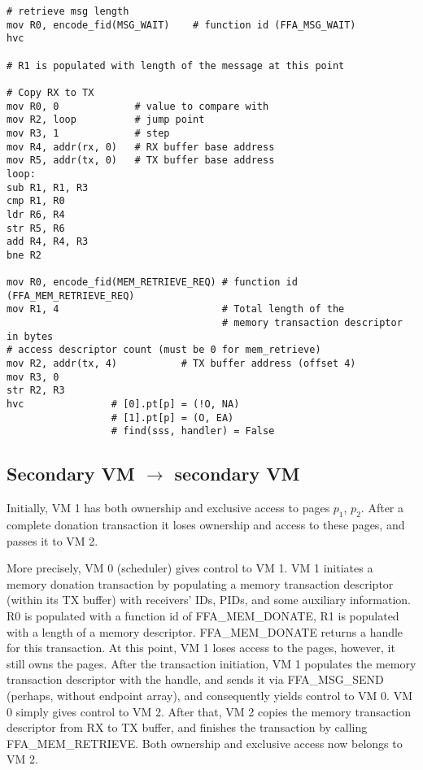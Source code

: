 \documentclass{article}
\begin{document}
\begin{lstlisting}[caption={VM 1}]
# retrieve msg length
mov R0, encode_fid(MSG_WAIT)    # function id (FFA_MSG_WAIT)
hvc

# R1 is populated with length of the message at this point

# Copy RX to TX
mov R0, 0             # value to compare with
mov R2, loop          # jump point
mov R3, 1             # step
mov R4, addr(rx, 0)   # RX buffer base address
mov R5, addr(tx, 0)   # TX buffer base address
loop:
sub R1, R1, R3
cmp R1, R0
ldr R6, R4
str R5, R6
add R4, R4, R3
bne R2

mov R0, encode_fid(MEM_RETRIEVE_REQ) # function id (FFA_MEM_RETRIEVE_REQ)
mov R1, 4                            # Total length of the  
                                     # memory transaction descriptor in bytes
# access descriptor count (must be 0 for mem_retrieve)
mov R2, addr(tx, 4)           # TX buffer address (offset 4)
mov R3, 0
str R2, R3                                    
hvc               # [0].pt[p] = (!O, NA)
                  # [1].pt[p] = (O, EA)
                  # find(sss, handler) = False
\end{lstlisting}

\subsection{Secondary VM $\rightarrow$ secondary VM}
Initially, VM 1 has both ownership and exclusive access to pages $p_1$, $p_2$. After a complete donation transaction it loses ownership and access to these pages, and passes it to VM 2.

More precisely, VM 0 (scheduler) gives control to VM 1. VM 1 initiates a memory donation transaction by populating a memory transaction descriptor (within its TX buffer) with receivers' IDs, PIDs, and some auxiliary information. R0 is populated with a function id of FFA\_MEM\_DONATE, R1 is populated with a length of a memory descriptor. FFA\_MEM\_DONATE returns a handle for this transaction. At this point, VM 1 loses access to the pages, however, it still owns the pages. After the transaction initiation, VM 1 populates the memory transaction descriptor with the handle, and sends it via FFA\_MSG\_SEND (perhaps, without endpoint array), and consequently yields control to VM 0. VM 0 simply gives control to VM 2. After that, VM 2 copies the memory transaction descriptor from RX to TX buffer, and finishes the transaction by calling FFA\_MEM\_RETRIEVE. Both ownership and exclusive access now belongs to VM 2.
\end{document}
